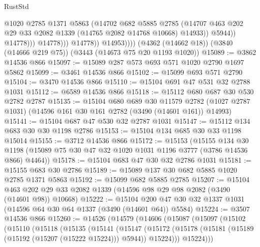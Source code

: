 \begin{lexlean}{RustStd}
\begin{coremodule}
                                @1020
                                @2785
                                @1371
                                @5863
                                (@14702
                                  @682
                                  @5885
                                  @2785
                                  (@14707
                                    @463
                                    @202
                                    @29
                                    @33
                                    @2082
                                    @1339
                                    (@14765 @2082 @14768 @10668)
                                    @14933))
                                @5944))
                            @14778)))
                      @14778)))
                @14778))
            @14953))))
    (@4362 (@14662 @18))
    (@3840 (@14666 @219 @75))
    (@3443 (@14673 @75 @20 @1193 @1020))
@15089 := @3862 @14536 @866
@15097 := @15089 @287 @573 @693 @571 @1020 @2790 @1697 @5862
@15099 := @3461 @14536 @866
@15102 := @15099 @693 @571 @2790
@15104 := @3470 @14536 @866
@15110 := @15104 @691 @47 @531 @32 @2788 @1031
@15112 := @6589 @14536 @866
@15118 := @15112 @680 @687 @30 @530 @2782 @2787
@15135 := @15104
    @680
    @689
    @30
    @11579
    @2782
    (@1027 @2787 @1031)
    (@14596 @161 @30 @161 @2782 (@3490 (@14601 @161)) @14993)
@15141 := @15104 @687 @47 @530 @32 @2787 @1031
@15147 := @15112 @134 @683 @30 @30 @1198 @2786
@15153 := @15104 @134 @685 @30 @33 @1198 @15014
@15155 := @3712 @14536 @866
@15172 := @15153
    (@15155
      @134
      @30
      @1198
      (@15089 @75 @30 @47 @32 @1020 @1031 @1196 @3777 (@3786 @14536 @866) @4464))
@15178 := @15104 @683 @47 @30 @32 @2786 @1031
@15181 := @15155 @683 @30 @2786
@15189 := @15089 @137 @30 @682 @5885 @1020 @2785 @1371 @5863
@15192 := @15099 @682 @5885 @2785
@15207 := @15104
    @463
    @202
    @29
    @33
    @2082
    @1339
    (@14596 @98 @29 @98 @2082 (@3490 (@14601 @98)) @10668)
@15222 := @15104 @200 @47 @30 @32 @1337 @1031 (@14596 @64 @30 @64 @1337 (@3490 (@14601 @64)) @5584)
@15224 := @3507 @14536 @866
@15260 := @14526
    (@14579
      (@14606
        (@15087
          (@15097
            (@15102
              (@15110
                (@15118
                  (@15135
                    (@15141
                      (@15147
                        (@15172
                          (@15178
                            (@15181 (@15189 (@15192 (@15207 (@15222 @15224))) @5944))
                            @15224)))
                      @15224)))

\end{coremodule}
\end{lexlean}
